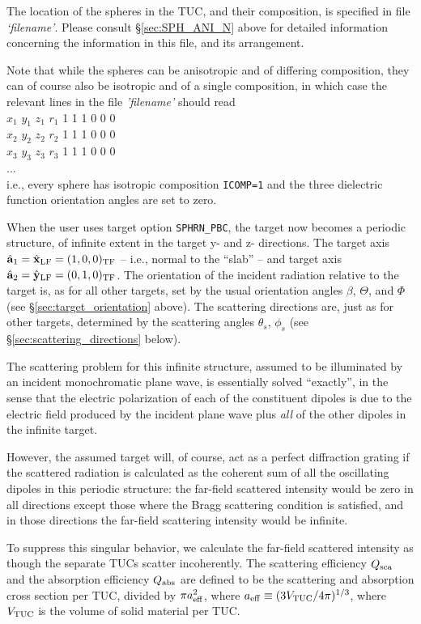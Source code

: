 	The location of the spheres in the TUC, and their composition, is
	specified in file {\it `filename'}.
	{%
	Please consult \S\ref{sec:SPH_ANI_N} above
	for detailed information concerning the information in this file,
	and its arrangement.}

	Note that while the spheres can be anisotropic and of differing
	composition, they can of course also be isotropic and of a single
	composition, in which case the relevant lines in the
	file {\it 'filename'} should read\\
	$x_1$ $y_1$ $z_1$ $r_1$ 1 1 1 0 0 0 \\
	$x_2$ $y_2$ $z_2$ $r_2$ 1 1 1 0 0 0 \\
	$x_3$ $y_3$ $z_3$ $r_3$ 1 1 1 0 0 0 \\
	...\\
	i.e., every sphere has isotropic composition {\tt ICOMP=1} and
	the three dielectric function orientation angles are set to zero.

	When the user uses target option {\tt SPHRN\_PBC}, the target now
	becomes a periodic structure, of infinite extent in the target
	y- and z- directions.
	The target axis ${\hat{\bf a}}_1 = \hat{\bf x}_{\rm LF} = (1,0,0)_{\rm TF}$ --
	i.e., normal to the ``slab'' -- and target
	axis ${\hat{\bf a}}_2 = \hat{\bf y}_{\rm LF} = (0,1,0)_{\rm TF}$.
	The orientation of the incident radiation relative to the target
	is, as for all other targets, set by the usual orientation
	angles $\beta$, $\Theta$, and $\Phi$ 
	(see \S\ref{sec:target_orientation} above).
	The scattering directions are, just as for other targets,
	determined by the scattering angles $\theta_s$, $\phi_s$ (see
	\S\ref{sec:scattering_directions} below).

	The scattering problem for this infinite structure, assumed to
	be illuminated by an incident monochromatic plane wave, is
	essentially solved ``exactly'', in the sense that the electric
	polarization of each of the constituent dipoles is due to the
	electric field produced by the incident plane wave plus {\it all}
	of the other dipoles in the infinite target.

	However, the assumed target will, of course, act as a perfect 
	diffraction
	grating if the scattered radiation is calculated as the coherent
	sum of all the oscillating dipoles in this periodic structure: the
	far-field 
	scattered intensity would be zero in all directions except those
	where the Bragg scattering condition is satisfied, and in those
	directions the far-field scattering intensity would be infinite.

	To suppress this singular behavior, we calculate the far-field
	scattered intensity as though the separate TUCs 
	scatter incoherently.
	The scattering efficiency $Q_{\rm sca}$ and the absorption efficiency
	$Q_{\rm abs}$ are defined to be the scattering and absorption cross
	section per TUC, divided by $\pi {a}_{\rm eff}^2$, where 
	${a}_{\rm eff}\equiv(3V_{\rm TUC}/4\pi)^{1/3}$, where $V_{\rm TUC}$ is
	the volume of solid material per TUC.

